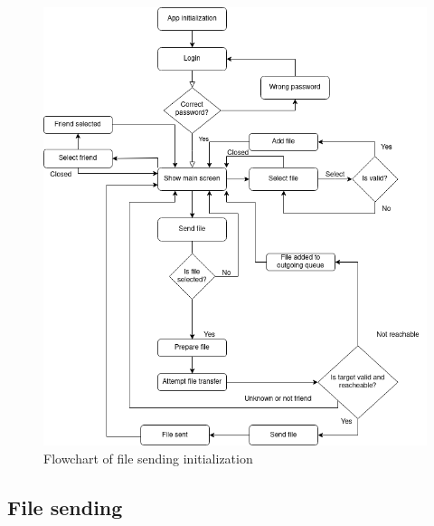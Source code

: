 \begin{figure}[ht]
    \centering
    \includegraphics[scale = 0.5]{images/filesending.png}
    \caption{Flowchart of file sending initialization}
    \label{fig:flowchart}
\end{figure}
\subsection{File sending}
